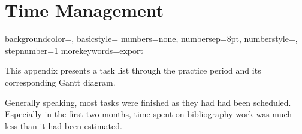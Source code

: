 
\chapter{Time Management} %

\label{AppendixC} %


{
    backgroundcolor=\color{black},
    basicstyle=\scriptsize\color{white}\ttfamily
    numbers=none,
    numbersep=8pt,                   %
    numberstyle=\tiny\color{white}, %
    stepnumber=1                    %
}
{
  morekeywords={export}
}

This appendix presents a task list through the practice period and its corresponding Gantt diagram.

Generally speaking, most tasks were finished as they had had been scheduled. Especially in the first two months, time spent on bibliography work was much less than it had been estimated. 

